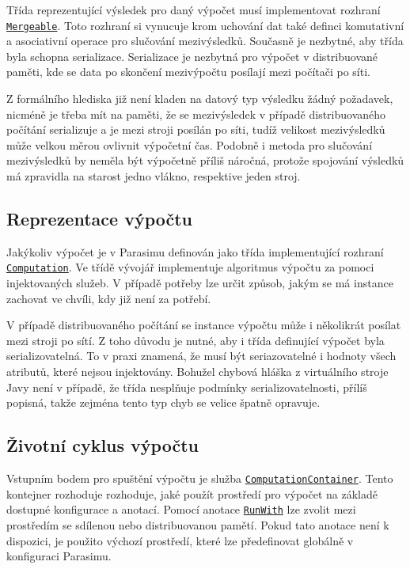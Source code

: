 Třída reprezentující výsledek pro daný výpočet musí implementovat rozhraní \href{https://github.com/sybila/parasim/blob/2.0.0.Final/model/core/src/main/java/org/sybila/parasim/model/Mergeable.java}{\texttt{Mergeable}}. Toto rozhraní si vynucuje krom uchování dat také definci komutativní
a asociativní operace pro slučování mezivýsledků. Sou\-čas\-ně je nezbytné, aby třída
byla schopna serializace. Serializace je nezbytná pro výpočet v dis\-tri\-buo\-va\-né paměti,
kde se data po skončení mezivýpočtu po\-sí\-la\-jí mezi počítači po síti.

Z formálního hlediska již není kladen na datový typ výsledku žádný požadavek, nicméně
je třeba mít na paměti, že se mezivýsledek v případě distribuovaného počítání
serializuje a je mezi stroji posílán po síti, tudíž velikost mezivýsledků může velkou měrou
ovlivnit výpočetní čas. Podobně i metoda pro slučování mezivýsledků by neměla být vý\-po\-čet\-ně
příliš náročná, protože spojování výsledků má zpravidla na starost jedno vlákno, respektive
jeden stroj.

\subsection{Reprezentace výpočtu}

Jakýkoliv výpočet je v Parasimu definován jako třída implementující rozhraní \href{https://github.com/sybila/parasim/blob/2.0.0.Final/extensions/computation-lifecycle-api/src/main/java/org/sybila/parasim/computation/lifecycle/api/Computation.java}{\texttt{Computation}}. Ve třídě vývojář
implementuje algoritmus výpočtu za pomoci injektovaných služeb. V případě potřeby
lze určit způsob, jakým se má instance zachovat ve chvíli, kdy již není za potřebí.

V případě distribuovaného počítání se instance výpočtu může i ně\-ko\-lik\-rát posílat mezi stroji po sítí. Z toho důvodu
je nutné, aby i třída definující výpočet byla serializovatelná. To v praxi znamená, že musí
být seriazovatelné i hodnoty všech atributů, které nejsou injektovány. Bohužel chybová hláška z virtuálního stroje Javy
není v případě, že třída nesplňuje podmínky serializovatelnosti, přílíš popisná, takže
zejména tento typ chyb se velice špatně opravuje.

\subsection{Životní cyklus výpočtu}

Vstupním bodem pro spuštění výpočtu je služba \href{https://github.com/sybila/parasim/blob/2.0.0.Final/extensions/computation-lifecycle-api/src/main/java/org/sybila/parasim/computation/lifecycle/api/ComputationContainer.java}{\texttt{ComputationContainer}}. Tento kontejner rozhoduje
rozhoduje, jaké použít prostředí pro výpočet na základě dostupné konfigurace a anotací.
Pomocí anotace \href{https://github.com/sybila/parasim/blob/2.0.0.Final/extensions/computation-lifecycle-api/src/main/java/org/sybila/parasim/computation/lifecycle/api/annotations/RunWith.java}{\texttt{RunWith}} lze zvolit mezi prostředím se sdílenou nebo distribuovanou pamětí. Pokud tato anotace
není k dispozici, je použito výchozí prostředí, které lze předefinovat globálně v konfiguraci
Parasimu.

